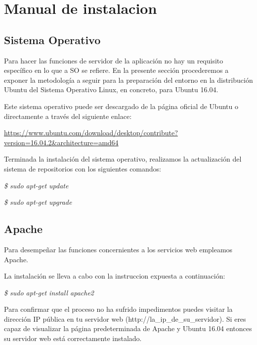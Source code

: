 \documentclass[11pt,spanish,
		listoftables,listoffigures]
		{tfgplantilla}
\begin{document}
\newpage
\section{Manual de instalacion}

\subsection {Sistema Operativo}

Para hacer las funciones de servidor de la aplicación no hay un requisito específico en lo que a SO se refiere. En la presente sección procederemos a exponer la metodología a seguir para la preparación del entorno en la distribución Ubuntu del Sistema Operativo Linux, en concreto, para Ubuntu 16.04.

Este sistema operativo puede ser descargado de la página oficial de Ubuntu o directamente a través del siguiente enlace:

\noindent \url {https://www.ubuntu.com/download/desktop/contribute?version=16.04.2&architecture=amd64}

Terminada la instalación del sistema operativo, realizamos la actualización del sistema de repositorios con los siguientes comandos:

\textit {\$ sudo apt-get update}

\textit {\$ sudo apt-get upgrade}

\subsection {Apache}

Para desempeñar las funciones concernientes a los servicios web empleamos Apache. 

La instalación se lleva a cabo con la instruccion expuesta a continuación:

\textit {\$ sudo apt-get install apache2}

Para confirmar que el proceso no ha sufrido impedimentos puedes visitar la dirección IP pública en tu servidor web (http://la\_ip\_de\_su\_servidor). Si eres capaz de visualizar la página predeterminada de Apache y Ubuntu 16.04 entonces su servidor web está correctamente instalado.
\end{document}
